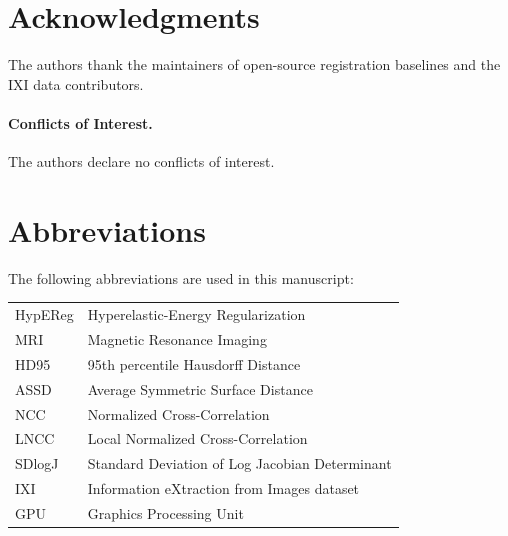 \documentclass[11pt,a4paper]{article}
\begin{document}
%
%

\section*{Acknowledgments}

The authors thank the maintainers of open-source registration baselines and the IXI data contributors.

\paragraph{Conflicts of Interest.}
The authors declare no conflicts of interest.



\section*{Abbreviations}


The following abbreviations are used in this manuscript:
\\
\noindent
\begin{tabular}{@{}ll}
HypEReg & Hyperelastic-Energy Regularization\\
MRI & Magnetic Resonance Imaging\\
HD95 & 95th percentile Hausdorff Distance\\
ASSD & Average Symmetric Surface Distance\\
NCC & Normalized Cross-Correlation\\
LNCC & Local Normalized Cross-Correlation\\
SDlogJ & Standard Deviation of Log Jacobian Determinant\\
IXI & Information eXtraction from Images dataset\\
GPU & Graphics Processing Unit
\end{tabular}





\end{document}

